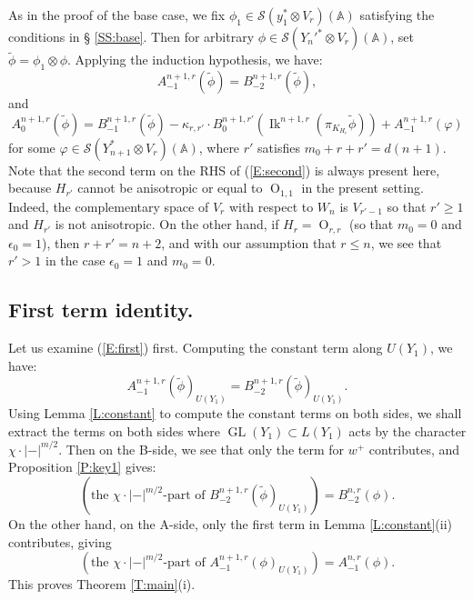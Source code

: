 \documentclass[10pt]{amsart}
\theoremstyle{plain}
\numberwithin{equation}{section}
\begin{document}
 As in the proof of the base case, we fix $\phi_1 \in
 \mathcal{S}(y_1^* \otimes V_r)({\mathbb{A}})$ satisfying the conditions in \S
 \ref{SS:base}. Then for arbitrary  $\phi \in
 \mathcal{S}(Y_n'^* \otimes V_r)({\mathbb{A}})$, set $\tilde{\phi} = \phi_1
 \otimes \phi$.
 Applying the induction hypothesis, we have:
 \begin{equation} \label{E:first} 
 A^{n+1, r}_{-1}(\tilde{\phi}) =   
 B^{n+1,r}_{-2}(\tilde{\phi}), 
\end{equation}
 and 
\begin{equation} \label{E:second}
   A_0^{n+1,r}(\tilde{\phi})  =  
   B^{n+1,r}_{-1}(\tilde{\phi}) -   \kappa_{r,r'} \cdot B_0^{n+1,
     r'}({\operatorname{Ik}}^{n+1,r}(\pi_{K_{H_r}}\tilde{\phi}))   +
   A^{n+1,r}_{-1}(\varphi) 
\end{equation}
 for some $\varphi \in \mathcal{S}(Y_{n+1}^* \otimes V_r)({\mathbb{A}})$, where $r'$ satisfies $m_0 + r + r'  = d(n+1)$.
 Note that the second term on the RHS of (\ref{E:second}) is always present here, because $H_{r'}$ cannot be anisotropic or equal to ${\operatorname{O}}_{1,1}$ in the present setting. Indeed,
  the complementary space of $V_r$ with respect to $W_n$ is $V_{r'-1}$ so that $r' \geq 1$ and $H_{r'}$ is not anisotropic. On the other hand, if $H_r = {\operatorname{O}}_{r,r}$ (so that $m_0 = 0$ and $\epsilon_0 =1$), then $r+ r'  = n+2$, and with our assumption that $r \leq n$, we see that $r' > 1$ in the case $\epsilon_0 =1$ and $m_0 = 0$.  
 \vskip 5pt
 
 \subsection{\bf First term identity.}
 Let us examine (\ref{E:first}) first. Computing the constant term along $U(Y_1)$, we have:
 \[   A^{n+1, r}_{-1}(\tilde{\phi})_{U(Y_1)} =   B^{n+1,r}_{-2}(\tilde{\phi})_{U(Y_1)}. \] 
 Using Lemma \ref{L:constant} to compute the constant terms on both
 sides, we shall extract the terms on both sides where ${\operatorname{GL}}(Y_1)
 \subset L(Y_1)$ acts by the character $\chi \cdot |-|^{m/2}$. 
 Then on the B-side, we see that only the term for $w^+$ contributes,
 and Proposition \ref{P:key1} gives:
  \[ \left(\text{the $\chi \cdot |-|^{m/2}$-part of
    $B^{n+1,r}_{-2}(\tilde{\phi})_{U(Y_1)}$}\right) = B^{n,r}_{-2}(\phi). \]
 On the other hand, on the A-side, only the first term in Lemma \ref{L:constant}(ii)
 contributes, giving
 \[  \left(\text{the $\chi \cdot |-|^{m/2}$-part of $A^{n+1, r}_{-1}
   (\phi)_{U(Y_1)}$}\right) = A^{n,r}_{-1}(\phi). \]
 This proves Theorem \ref{T:main}(i). 
 \vskip 10pt
 
\end{document}
